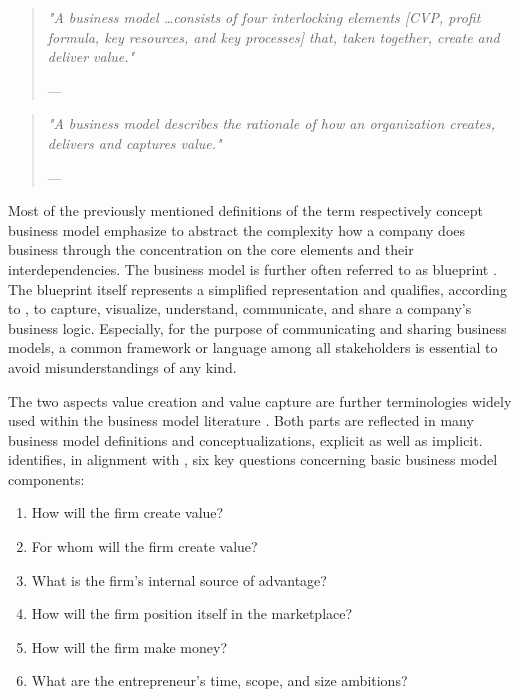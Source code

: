 \begin{quote}{\slshape 
"A business model \ldots consists of four interlocking elements [\ac{CVP}, profit formula, key resources, and key processes] that, taken together, create and deliver value."}
\vspace*{-5pt}
\begin{flushright}
	--- \citet[p. 52]{Johnson2008}
\end{flushright}
\end{quote}

\begin{quote}{\slshape 
"A business model describes the rationale of how an organization creates, delivers and captures value."}
\vspace*{-5pt}
\begin{flushright}
	--- \citet[p. 14]{Osterwalder2010}
\end{flushright}
\end{quote}

Most of the previously mentioned definitions of the term respectively concept business model emphasize to abstract the complexity how a company does business through the concentration on the core elements and their interdependencies. The business model is further often referred to as blueprint . The blueprint itself represents a simplified representation and qualifies, according to \citet[pp. 11-14]{Osterwalder2005}, to capture, visualize, understand, communicate, and share a company's business logic. Especially, for the purpose of communicating and sharing business models, a common framework or language among all stakeholders is essential to avoid misunderstandings of any kind.

The two aspects value creation and value capture are further terminologies widely used within the business model literature . Both parts are reflected in many business model definitions and conceptualizations, explicit as well as implicit. \citet[pp. 729-732]{Morris2005} identifies, in alignment with \citet[pp. 49-61]{Drucker1954}, six key questions concerning basic business model components:

\begin{enumerate}
	\item How will the firm create value?
	\item For whom will the firm create value?
	\item What is the firm's internal source of advantage?
	\item How will the firm position itself in the marketplace?
	\item How will the firm make money?
	\item What are the entrepreneur's time, scope, and size ambitions?
\end{enumerate}

